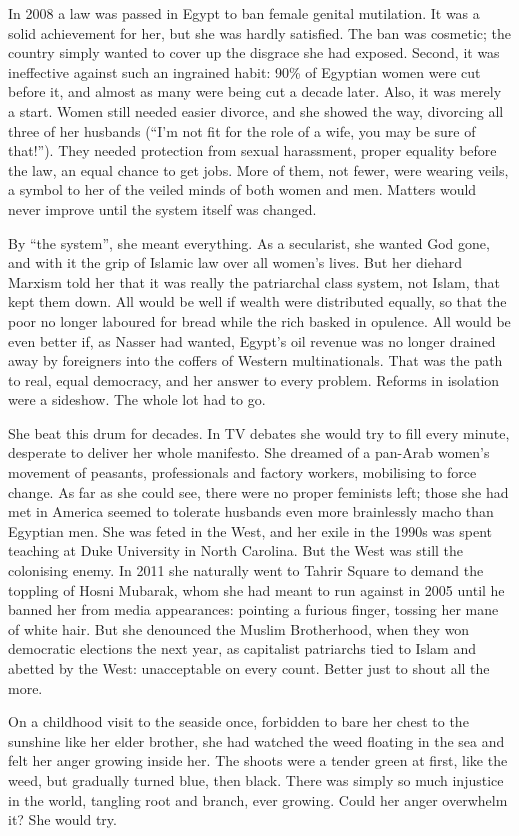 \documentclass{article}
\begin{document}
In 2008 a law was passed in Egypt to ban female genital mutilation. It was a solid achievement for her, but she was hardly satisfied. The ban was cosmetic; the country simply wanted to cover up the disgrace she had exposed. Second, it was ineffective against such an ingrained habit: 90\% of Egyptian women were cut before it, and almost as many were being cut a decade later. Also, it was merely a start. Women still needed easier divorce, and she showed the way, divorcing all three of her husbands (``I'm not fit for the role of a wife, you may be sure of that!''). They needed protection from sexual harassment, proper equality before the law, an equal chance to get jobs. More of them, not fewer, were wearing veils, a symbol to her of the veiled minds of both women and men. Matters would never improve until the system itself was changed. 

By ``the system'', she meant everything. As a secularist, she wanted God gone, and with it the grip of Islamic law over all women's lives. But her diehard Marxism told her that it was really the patriarchal class system, not Islam, that kept them down. All would be well if wealth were distributed equally, so that the poor no longer laboured for bread while the rich basked in opulence. All would be even better if, as Nasser had wanted, Egypt's oil revenue was no longer drained away by foreigners into the coffers of Western multinationals. That was the path to real, equal democracy, and her answer to every problem. Reforms in isolation were a sideshow. The whole lot had to go. 

She beat this drum for decades. In TV debates she would try to fill every minute, desperate to deliver her whole manifesto. She dreamed of a pan-Arab women's movement of peasants, professionals and factory workers, mobilising to force change. As far as she could see, there were no proper feminists left; those she had met in America seemed to tolerate husbands even more brainlessly macho than Egyptian men. She was feted in the West, and her exile in the 1990s was spent teaching at Duke University in North Carolina. But the West was still the colonising enemy. In 2011 she naturally went to Tahrir Square to demand the toppling of Hosni Mubarak, whom she had meant to run against in 2005 until he banned her from media appearances: pointing a furious finger, tossing her mane of white hair. But she denounced the Muslim Brotherhood, when they won democratic elections the next year, as capitalist patriarchs tied to Islam and abetted by the West: unacceptable on every count. Better just to shout all the more. 

On a childhood visit to the seaside once, forbidden to bare her chest to the sunshine like her elder brother, she had watched the weed floating in the sea and felt her anger growing inside her. The shoots were a tender green at first, like the weed, but gradually turned blue, then black. There was simply so much injustice in the world, tangling root and branch, ever growing. Could her anger overwhelm it? She would try. {} 
\clearpage
\end{document}
